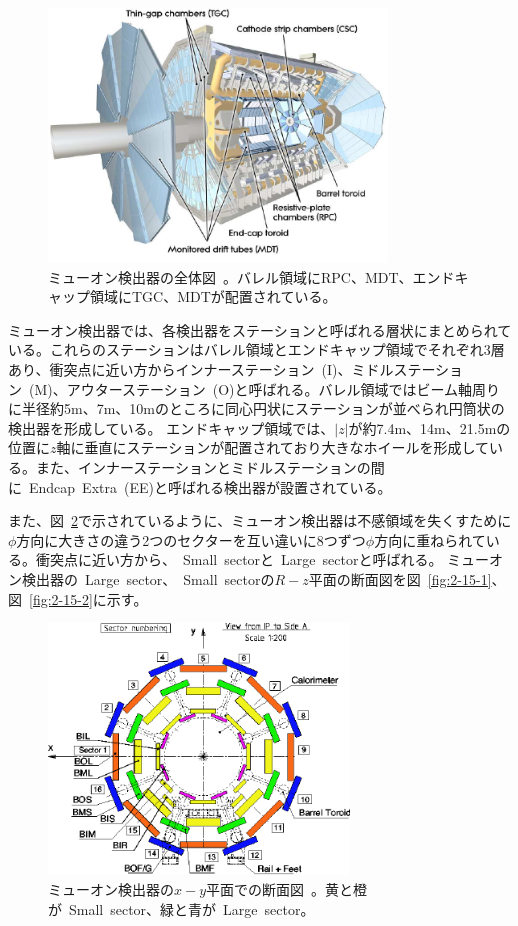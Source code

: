 \begin{figure}[h]
  \centering
  \includegraphics[clip, width=9cm]{fig/2/muondetector.pdf}
  \caption{ミューオン検出器の全体図~\cite{Aad:1129811}。バレル領域にRPC、MDT、エンドキャップ領域にTGC、MDTが配置されている。}
  \label{fig:2-13}
\end{figure}

ミューオン検出器では、各検出器をステーションと呼ばれる層状にまとめられている。これらのステーションはバレル領域とエンドキャップ領域でそれぞれ3層あり、衝突点に近い方からインナーステーション~(I)、ミドルステーション~(M)、アウターステーション~(O)と呼ばれる。バレル領域ではビーム軸周りに半径約5m、7m、10mのところに同心円状にステーションが並べられ円筒状の検出器を形成している。
エンドキャップ領域では、$|z|$が約7.4m、14m、21.5mの位置に$z$軸に垂直にステーションが配置されており大きなホイールを形成している。また、インナーステーションとミドルステーションの間に~Endcap~Extra~(EE)と呼ばれる検出器が設置されている。

また、図~\ref{fig:2-14}で示されているように、ミューオン検出器は不感領域を失くすために$\phi$方向に大きさの違う2つのセクターを互い違いに8つずつ$\phi$方向に重ねられている。衝突点に近い方から、~Small~sectorと~Large~sectorと呼ばれる。
ミューオン検出器の~Large~sector、~Small~sectorの$R-z$平面の断面図を図~\ref{fig:2-15-1}、図~\ref{fig:2-15-2}に示す。

\begin{figure}[h]
  \centering
  \includegraphics[clip, width=8cm]{fig/2/muon_detector_xy.pdf}
  \caption{ミューオン検出器の$x-y$平面での断面図~\cite{Aad:1129811}。黄と橙が~Small~sector、緑と青が~Large~sector。}
  \label{fig:2-14}
\end{figure}


